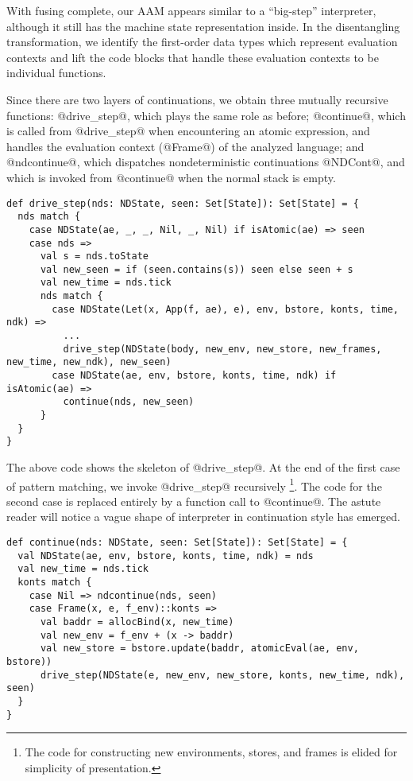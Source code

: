 \documentclass[acmsmall]{acmart}\settopmatter{}
\begin{document}
With fusing complete, our AAM
appears similar to a ``big-step'' interpreter, although it still has the machine
state representation inside.
In the disentangling transformation, we
identify the first-order data types which represent evaluation contexts
and lift the code blocks that handle these evaluation contexts to be individual functions.

Since there are two layers of continuations,
we obtain three mutually recursive functions: @drive_step@, which plays the same
role as before; @continue@, which is called from @drive_step@ when encountering an atomic 
expression, and handles the evaluation context (@Frame@) of the analyzed
language; and @ndcontinue@, which dispatches nondeterministic continuations @NDCont@,
and which is invoked from @continue@ when the normal stack is empty.

\begin{lstlisting}
def drive_step(nds: NDState, seen: Set[State]): Set[State] = {
  nds match {
    case NDState(ae, _, _, Nil, _, Nil) if isAtomic(ae) => seen
    case nds =>
      val s = nds.toState
      val new_seen = if (seen.contains(s)) seen else seen + s
      val new_time = nds.tick
      nds match {
        case NDState(Let(x, App(f, ae), e), env, bstore, konts, time, ndk) =>
          ...
          drive_step(NDState(body, new_env, new_store, new_frames, new_time, new_ndk), new_seen)
        case NDState(ae, env, bstore, konts, time, ndk) if isAtomic(ae) =>
          continue(nds, new_seen)
      }
  }
}
\end{lstlisting}

The above code shows the skeleton of @drive_step@.
At the end of the first case of pattern matching, we invoke @drive_step@ recursively 
\footnote{The code for constructing new environments, stores, and frames is elided for 
simplicity of presentation.}.
The code for the second case is replaced entirely by a function call to @continue@.
The astute reader will notice a vague shape of interpreter in continuation style has emerged.

\begin{lstlisting}
def continue(nds: NDState, seen: Set[State]): Set[State] = {
  val NDState(ae, env, bstore, konts, time, ndk) = nds
  val new_time = nds.tick
  konts match {
    case Nil => ndcontinue(nds, seen)
    case Frame(x, e, f_env)::konts =>
      val baddr = allocBind(x, new_time)
      val new_env = f_env + (x -> baddr)
      val new_store = bstore.update(baddr, atomicEval(ae, env, bstore))
      drive_step(NDState(e, new_env, new_store, konts, new_time, ndk), seen)
  }
}
\end{lstlisting}
\end{document}
